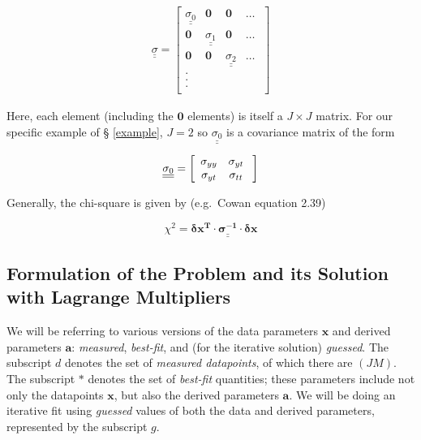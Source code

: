 \documentclass[psfig,preprint]{aastex}
\begin{document}
\begin{eqnarray} \label{sigma}
\underline{\underline{\sigma}} = 
\left[
\begin{array}{cccc}
\underline{\underline{\sigma_0}} & {\mathbf 0} & {\mathbf 0} & \dots \\
{\mathbf 0} & \underline{\underline{\sigma_1}} & {\mathbf 0} & \dots \\ 
{\mathbf 0} & {\mathbf 0} & \underline{\underline{ \sigma_2}} & \dots \\
. \\
. \\
. \\
\end{array}
\; \right]
\end{eqnarray}


\noindent Here, each element (including the $\mathbf 0$ elements) is
itself a $J \times J$ matrix.  For our specific example of \S
\ref{example}, $J=2$ so $\underline{\underline{\sigma_0}}$ is a
covariance matrix of the form

\begin{eqnarray} \label{sigma0}
\underline{\underline{\sigma_0}} =
{\left[
\begin{array}{cc}
\mathnormal{\sigma_{yy}} & \sigma_{yt} \\
\sigma_{yt} & \sigma_{tt} \\
\end{array}
\; \right]}
\end{eqnarray}
                                                                        
                  
\noindent Generally, the chi-square is given by (e.g.\ Cowan equation 2.39)

\begin{equation} \label{chisqj}
\chi^2 = \mathbf{ \delta x^T \cdot \underline{\underline {\sigma^{-1}}} \cdot \delta x}
\end{equation}

\subsection{Formulation of the Problem and its Solution with Lagrange
Multipliers}

We will be referring to various versions of the data parameters
$\mathbf{x}$ and derived parameters $\mathbf{a}$: {\it measured}, {\it
best-fit}, and (for the iterative solution) {\it guessed}.  The
subscript $d$ denotes the set of {\it measured datapoints}, of
which there are $(JM)$.  The subscript $*$ denotes the set of {\it
best-fit} quantities; these parameters include not only the datapoints
$\mathbf x$, but also the derived parameters $\mathbf a$.  We will be
doing an iterative fit using {\it guessed} values of both the data and
derived parameters, represented by the subscript $g$.
\end{document}

